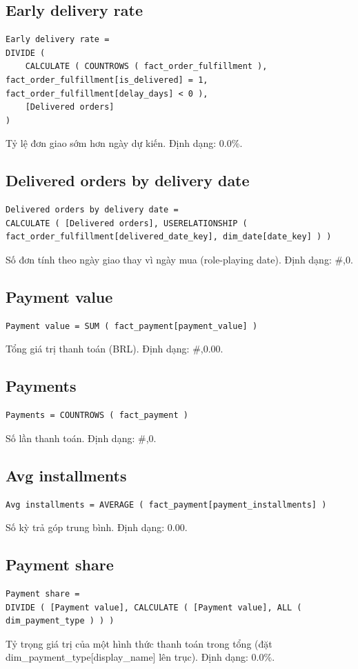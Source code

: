 \subsection*{Early delivery rate}
\begin{lstlisting}[language={}]
Early delivery rate =
DIVIDE (
    CALCULATE ( COUNTROWS ( fact_order_fulfillment ), fact_order_fulfillment[is_delivered] = 1, fact_order_fulfillment[delay_days] < 0 ),
    [Delivered orders]
)
\end{lstlisting}
Tỷ lệ đơn giao sớm hơn ngày dự kiến. Định dạng: 0.0\%.

\subsection*{Delivered orders by delivery date}
\begin{lstlisting}[language={}]
Delivered orders by delivery date =
CALCULATE ( [Delivered orders], USERELATIONSHIP ( fact_order_fulfillment[delivered_date_key], dim_date[date_key] ) )
\end{lstlisting}
Số đơn tính theo ngày giao thay vì ngày mua (role-playing date). Định dạng: \#,0.

\subsection*{Payment value}
\begin{lstlisting}[language={}]
Payment value = SUM ( fact_payment[payment_value] )
\end{lstlisting}
Tổng giá trị thanh toán (BRL). Định dạng: \#,0.00.

\subsection*{Payments}
\begin{lstlisting}[language={}]
Payments = COUNTROWS ( fact_payment )
\end{lstlisting}
Số lần thanh toán. Định dạng: \#,0.

\subsection*{Avg installments}
\begin{lstlisting}[language={}]
Avg installments = AVERAGE ( fact_payment[payment_installments] )
\end{lstlisting}
Số kỳ trả góp trung bình. Định dạng: 0.00.

\subsection*{Payment share}
\begin{lstlisting}[language={}]
Payment share =
DIVIDE ( [Payment value], CALCULATE ( [Payment value], ALL ( dim_payment_type ) ) )
\end{lstlisting}
Tỷ trọng giá trị của một hình thức thanh toán trong tổng (đặt dim\_payment\_type[display\_name] lên trục). Định dạng: 0.0\%.

